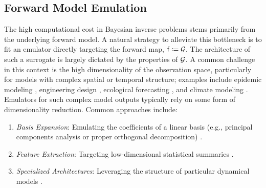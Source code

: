 \documentclass[12pt]{article}
\begin{document}
\subsection{Forward Model Emulation}
The high computational cost in Bayesian inverse problems stems primarily from the underlying forward model. 
A natural strategy to alleviate this bottleneck is to fit an emulator directly targeting the forward map, $\mathsf{f} \coloneqq \mathcal{G}$. 
The architecture of such a surrogate is largely dictated by the properties of $\mathcal{G}$.
A common challenge in this context is the high dimensionality of the observation space,
particularly for models with complex spatial or temporal structure; examples include 
epidemic modeling \citep{FadikarAgentBased},
engineering design \citep{PODemulation}, ecological forecasting 
\citep{emPostDens,DagonCLM}, and climate modeling \citep{ESM_modeling_2pt0,idealizedGCM}.
Emulators for such complex model outputs typically rely on some form of dimensionality reduction. Common approaches include:
\begin{enumerate}
\item \emph{Basis Expansion}: Emulating the coefficients of a linear basis 
(e.g., principal components analysis or proper orthogonal decomposition) \citep{HigdonBasis,FadikarAgentBased,PODemulation}.
\item \emph{Feature Extraction}: Targeting low-dimensional statistical summaries 
\citep{ESM_modeling_2pt0,idealizedGCM,CLMBayesianCalibration,CLMSurrogates}.
\item \emph{Specialized Architectures}: Leveraging the structure of particular
dynamical models 
\citep{GP_dynamic_emulation, Bayesian_emulation_dynamic,Liu_West_dynamic_emulation, dynamic_nonlinear_simulators_GP}.
\end{enumerate} 
\end{document}
